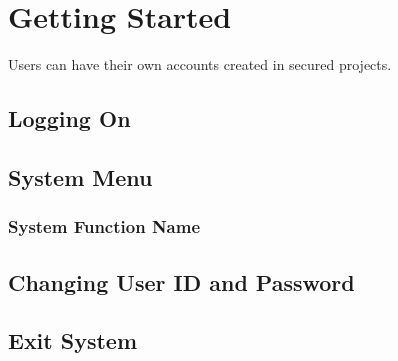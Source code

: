 \section{Getting Started}

Users can have their own accounts created in secured projects.


\subsection{Logging On}



\subsection{System Menu}

\subsubsection{System Function Name}

\subsection{Changing User ID and Password}

\subsection{Exit System}


